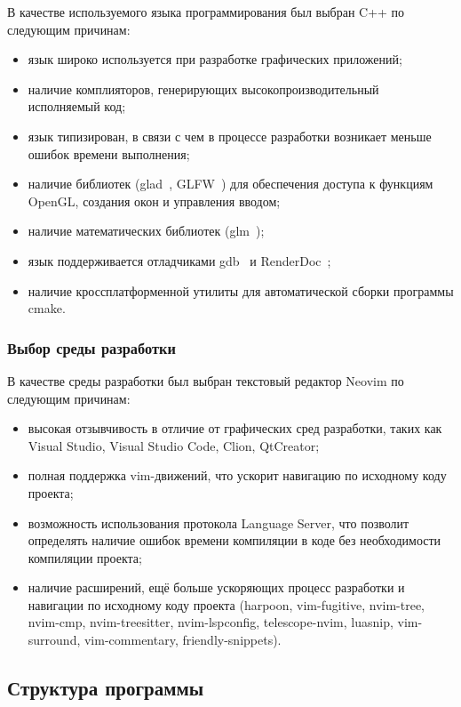 В качестве используемого языка программирования был выбран C++ по следующим причинам:
\begin{itemize}
    \item язык широко используется при разработке графических приложений;
    \item наличие комплияторов, генерирующих высокопроизводительный исполняемый код;
    \item язык типизирован, в связи с чем в процессе разработки возникает меньше ошибок времени выполнения;
    \item наличие библиотек (glad~\cite{glad}, GLFW~\cite{glfw}) для обеспечения доступа к функциям OpenGL, создания окон и управления вводом;
    \item наличие математических библиотек (glm~\cite{glm});
    \item язык поддерживается отладчиками gdb~\cite{gdb} и RenderDoc~\cite{rd};
    \item наличие кроссплатформенной утилиты для автоматической сборки программы cmake.
\end{itemize}

\subsubsection{Выбор среды разработки}

В качестве среды разработки был выбран текстовый редактор Neovim \cite{nvim} по следующим причинам:
\begin{itemize}
    \item высокая отзывчивость в отличие от графических сред разработки, таких как Visual Studio, Visual Studio Code, Clion, QtCreator;
    \item полная поддержка vim-движений, что ускорит навигацию по исходному коду проекта;
    \item возможность использования протокола Language Server, что позволит определять наличие ошибок времени компиляции в коде без необходимости компиляции проекта;
    \item наличие расширений, ещё больше ускоряющих процесс разработки и навигации по исходному коду проекта (harpoon, vim-fugitive, nvim-tree, nvim-cmp, nvim-treesitter, nvim-lspconfig, telescope-nvim, luasnip, vim-surround, vim-commentary, friendly-snippets).
\end{itemize}

\subsection{Структура программы}

